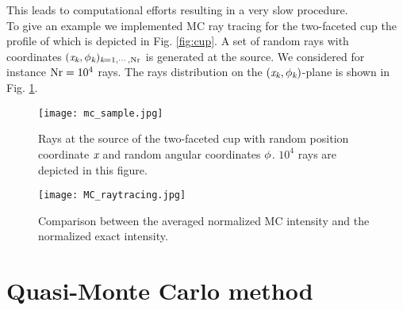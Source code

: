 This leads to computational efforts resulting in a very slow procedure.\\ \indent
To give an example we implemented MC ray tracing for the two-faceted cup the profile of which is depicted in Fig. \ref{fig:cup}.
A set of random rays with coordinates $(\textit{x}_{\textit{k}}, \phi_{\textit{k}})_{\textit{k}= 1, \cdots, \textrm{Nr}}$ is generated at the source. We considered for instance $\textrm{Nr}=10^4$ rays. The rays distribution on the $(\textit{x}_{\textit{k}}, \phi_{\textit{k}})$-plane is shown in Fig. \ref{fig:mc_sample}.
\begin{figure}[h]
\begin{center}
    \texttt{[image: mc\_sample.jpg]}
    \caption{Rays at the source of the two-faceted cup with random position coordinate $\textit{x}$ and random angular coordinates $\phi$. $10^4$ rays are depicted in this figure.}
    \label{fig:mc_sample}
\end{center}
  \end{figure}
\begin{figure}[t]
\begin{center}
    \texttt{[image: MC\_raytracing.jpg]}
    \caption{Comparison between the averaged normalized MC intensity and the normalized exact intensity.}
   \label{fig:mc_raytrancing_intensity}
\end{center}
\end{figure}

\section{Quasi-Monte Carlo method}
